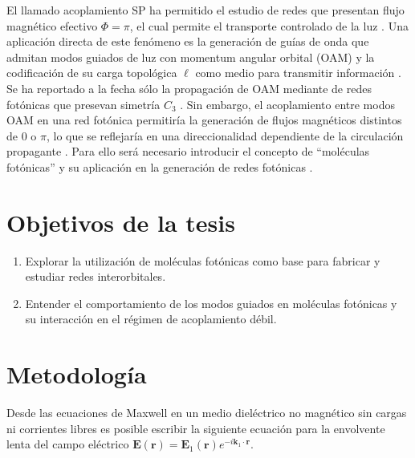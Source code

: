 \documentclass{article}
\begin{document}
	El llamado acoplamiento SP ha permitido el estudio de redes que presentan flujo magnético efectivo $\Phi = \pi$, el cual permite el transporte controlado de la luz \cite{OAMCaging, ABCaging}. Una aplicación directa de este fenómeno es la generación de guías de onda que admitan modos guiados de luz con momentum angular orbital (OAM) y la codificación de su carga topológica $\ell$ como medio para transmitir información \cite{oamapp, oamfree}. Se ha reportado a la fecha sólo la propagación de OAM mediante de redes fotónicas que presevan simetría $C_3$ \cite{OAMWG, vortex}. Sin embargo, el acoplamiento entre modos OAM en una red fotónica permitiría la generación de flujos magnéticos distintos de $0$ o $\pi$, lo que se reflejaría en una direccionalidad dependiente de la circulación propagante \cite{vortextrim, topoOAM}. Para ello será necesario introducir el concepto de ``moléculas fotónicas'' \cite{molecules} y su aplicación en la generación de redes fotónicas \cite{SPSSH}.
\section{Objetivos de la tesis}
\begin{enumerate}
	\item Explorar la utilización de moléculas fotónicas como base para fabricar y estudiar redes interorbitales.
	\item Entender el comportamiento de los modos guiados en moléculas fotónicas y su interacción en el régimen de acoplamiento débil.
\end{enumerate}
\section{Metodología}

Desde las ecuaciones de Maxwell en un medio dieléctrico no magnético sin cargas ni corrientes libres es posible escribir la siguiente ecuación para la envolvente lenta del campo eléctrico $\textbf{E}(\textbf{r}) = \textbf{E}_1(\textbf{r}) e^{-i \textbf{k}_1 \cdot \textbf{r}}$.
\end{document}
